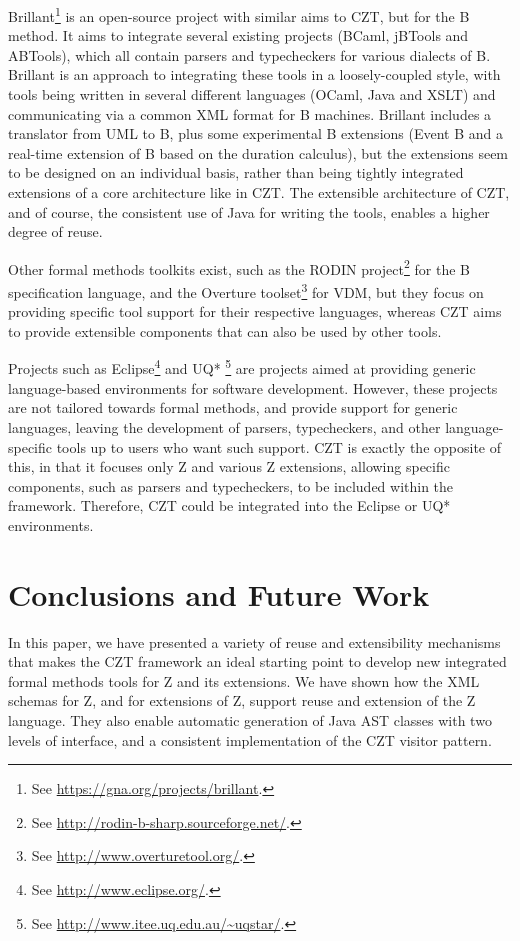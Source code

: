 \documentclass{llncs}
\begin{document}
  Brillant\footnote{See \url{https://gna.org/projects/brillant}.}  is
  an open-source project with similar aims to CZT, but for the B
  method. It aims to integrate several existing projects (BCaml,
  jBTools and ABTools), which all contain parsers and typecheckers for
  various dialects of B.  Brillant is an approach to integrating these
  tools in a loosely-coupled style, with tools being written in
  several different languages (OCaml, Java and XSLT) and communicating
  via a common XML format for B machines.  Brillant includes a
  translator from UML to B, plus some experimental B extensions (Event
  B and a real-time extension of B based on the duration calculus),
  but the extensions seem to be designed on an individual basis,
  rather than being tightly integrated extensions of a core
  architecture like in CZT.  The extensible architecture of CZT, and
  of course, the consistent use of Java for writing the
  tools, enables a higher degree of reuse.

  Other formal methods toolkits exist, such as the RODIN
  project\footnote{See \url{http://rodin-b-sharp.sourceforge.net/}.}
  for the B specification language, and the Overture
  toolset\footnote{See \url{http://www.overturetool.org/}.} for VDM,
  but they focus on providing specific tool support for their
  respective languages, whereas CZT aims to provide extensible
  components that can also be used by other tools.

  Projects such as Eclipse\footnote{See
  \url{http://www.eclipse.org/}.}  and UQ* \footnote{See
  \url{http://www.itee.uq.edu.au/~uqstar/}.} are projects aimed at
  providing generic language-based environments for software
  development. However, these projects are not tailored towards formal
  methods, and provide support for generic languages, leaving the
  development of parsers, typecheckers, and other language-specific tools
  up to users who want such support. CZT is exactly the opposite of this, in
  that it focuses only Z and various Z extensions, allowing specific
  components, such as parsers and typecheckers, to be included within
  the framework. Therefore, CZT could be integrated into the Eclipse
  or UQ* environments.

\section{Conclusions and Future Work} \label{sec:conclusions}

  In this paper, we have presented a variety of reuse and extensibility
  mechanisms that makes the CZT framework an ideal starting point to
  develop new integrated formal methods tools for Z and its
  extensions.  We have shown how the XML schemas for Z, and for
  extensions of Z, support reuse and extension of the Z language.
  They also enable automatic generation of Java AST classes with two
  levels of interface, and a consistent implementation of the CZT visitor
  pattern.
\end{document}
